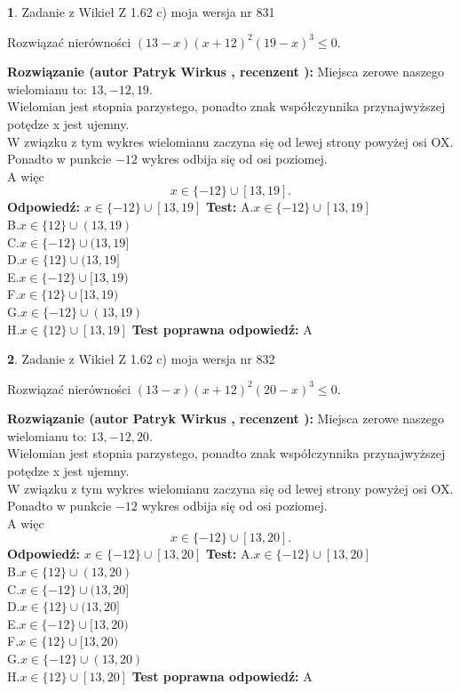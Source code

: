 \documentclass[12pt, a4paper]{article}
\theoremstyle{definition} %
\newtheorem{zad}{}
\newcommand{\zadStart}[1]{\begin{zad}#1\newline}
\newcommand{\zadStop}{\end{zad}}
\newcommand{\rozwStart}[2]{\noindent \textbf{Rozwiązanie (autor #1 , recenzent #2): }\newline}
\newcommand{\rozwStop}{\newline}
\newcommand{\odpStart}{\noindent \textbf{Odpowiedź:}\newline}
\newcommand{\odpStop}{\newline}
\newcommand{\testStart}{\noindent \textbf{Test:}\newline}
\newcommand{\testStop}{\newline}
\newcommand{\kluczStart}{\noindent \textbf{Test poprawna odpowiedź:}\newline}
\newcommand{\kluczStop}{\newline}
\begin{document}
\zadStart{Zadanie z Wikieł Z 1.62 c) moja wersja nr 831}

Rozwiązać nierówności $(13-x)(x+12)^{2}(19-x)^{3}\le0$.
\zadStop
\rozwStart{Patryk Wirkus}{}
Miejsca zerowe naszego wielomianu to: $13, -12, 19$.\\
Wielomian jest stopnia parzystego, ponadto znak współczynnika przy\linebreak najwyższej potędze x jest ujemny.\\ W związku z tym wykres wielomianu zaczyna się od lewej strony powyżej osi OX.\\
Ponadto w punkcie $-12$ wykres odbija się od osi poziomej.\\
A więc $$x \in \{-12\} \cup [13,19].$$
\rozwStop
\odpStart
$x \in \{-12\} \cup [13,19]$
\odpStop
\testStart
A.$x \in \{-12\} \cup [13,19]$\\
B.$x \in \{12\} \cup (13,19)$\\
C.$x \in \{-12\} \cup (13,19]$\\
D.$x \in \{12\} \cup (13,19]$\\
E.$x \in \{-12\} \cup [13,19)$\\
F.$x \in \{12\} \cup [13,19)$\\
G.$x \in \{-12\} \cup (13,19)$\\
H.$x \in \{12\} \cup [13,19]$
\testStop
\kluczStart
A
\kluczStop



\zadStart{Zadanie z Wikieł Z 1.62 c) moja wersja nr 832}

Rozwiązać nierówności $(13-x)(x+12)^{2}(20-x)^{3}\le0$.
\zadStop
\rozwStart{Patryk Wirkus}{}
Miejsca zerowe naszego wielomianu to: $13, -12, 20$.\\
Wielomian jest stopnia parzystego, ponadto znak współczynnika przy\linebreak najwyższej potędze x jest ujemny.\\ W związku z tym wykres wielomianu zaczyna się od lewej strony powyżej osi OX.\\
Ponadto w punkcie $-12$ wykres odbija się od osi poziomej.\\
A więc $$x \in \{-12\} \cup [13,20].$$
\rozwStop
\odpStart
$x \in \{-12\} \cup [13,20]$
\odpStop
\testStart
A.$x \in \{-12\} \cup [13,20]$\\
B.$x \in \{12\} \cup (13,20)$\\
C.$x \in \{-12\} \cup (13,20]$\\
D.$x \in \{12\} \cup (13,20]$\\
E.$x \in \{-12\} \cup [13,20)$\\
F.$x \in \{12\} \cup [13,20)$\\
G.$x \in \{-12\} \cup (13,20)$\\
H.$x \in \{12\} \cup [13,20]$
\testStop
\kluczStart
A
\kluczStop
\end{document}
